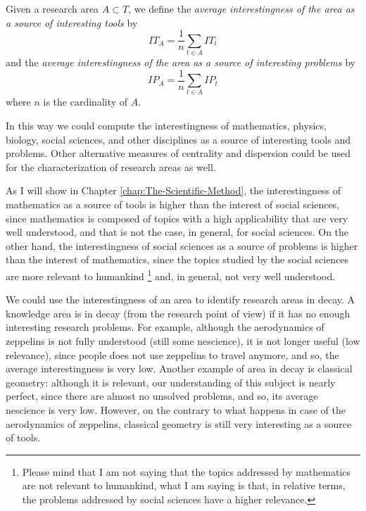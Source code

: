 \begin{definition}
Given a research area $A\subset T$, we define the \emph{average interestingness
of the area as a source of interesting tools} by
\[
IT_{A}=\frac{1}{n}\sum_{t\in A}IT_{t}
\]
and the \emph{average interestingness of the area as a source of interesting
problems} by
\[
IP_{A}=\frac{1}{n}\sum_{t\in A}IP_{t}
\]
where $n$ is the cardinality of $A$.
\end{definition}

In this way we could compute the interestingness of mathematics, physics, biology, social sciences, and other disciplines as a source of interesting tools and problems. Other alternative measures of centrality and dispersion could be used for the characterization of research areas as well.

As I will show in Chapter \ref{chap:The-Scientific-Method}, the interestingness of mathematics as a source of tools is higher than the interest of social sciences, since mathematics is composed of topics with a high applicability that are very well understood, and that is not the case, in general, for social sciences. On the other hand, the interestingness of social sciences as a source of problems is higher than the interest of mathematics, since the topics studied by the social sciences are more relevant to humankind \footnote{Please mind that I am not saying that the topics addressed by mathematics are not relevant to humankind, what I am saying is that, in relative terms, the problems addressed by social sciences have a higher relevance.} and, in general, not very well understood.

\begin{example}
We could use the interestingness of an area to identify research areas in decay. A knowledge area is in decay (from the research point of view) if it has no enough interesting research problems. For example, although the aerodynamics of zeppelins is not fully understood (still some nescience), it is not longer useful (low relevance), since people does not use zeppelins to travel anymore, and so, the average interestingness is very low. Another example of area in decay is classical geometry: although it is relevant, our understanding of this subject is nearly perfect, since there are almost no unsolved problems, and so, its average nescience is very low. However, on the contrary to what happens in case of the aerodynamics of zeppelins, classical geometry is still very interesting as a source of tools.
\end{example}

